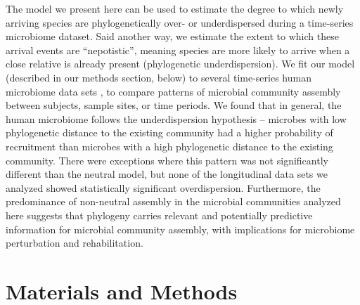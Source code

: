 \documentclass{article}
\begin{document}
\par
The model we present here can be used to estimate the degree to which newly arriving species are phylogenetically over- or underdispersed during a time-series microbiome dataset. Said another way, we estimate the extent to which these arrival events are “nepotistic”, meaning species are more likely to arrive when a close relative is already present (phylogenetic underdispersion). We fit our model (described in our methods section, below) to several time-series human microbiome data sets \cite{Caporaso2011,Koenig2011,Yassour2016}, to compare patterns of microbial community assembly between subjects, sample sites, or time periods. We found that in general, the human microbiome follows the underdispersion hypothesis – microbes with low phylogenetic distance to the existing community had a higher probability of recruitment than microbes with a high phylogenetic distance to the existing community. There were exceptions where this pattern was not significantly different than the neutral model, but none of the longitudinal data sets we analyzed showed statistically significant overdispersion. Furthermore, the predominance of non-neutral assembly in the microbial communities analyzed here suggests that phylogeny carries relevant and potentially predictive information for microbial community assembly, with implications for microbiome perturbation and rehabilitation. 
\\\par



\section{Materials and Methods}
\end{document}
